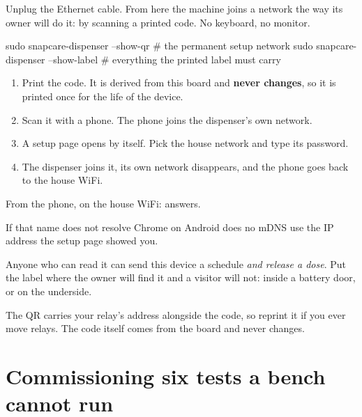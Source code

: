 \documentclass[11pt]{article}
\begin{document}
Unplug the Ethernet cable. From here the machine joins a network the way its
owner will do it: by scanning a printed code. No keyboard, no monitor.

\begin{shell}
sudo snapcare-dispenser --show-qr     # the permanent setup network
sudo snapcare-dispenser --show-label  # everything the printed label must carry
\end{shell}

\begin{enumerate}[leftmargin=*, itemsep=0.5ex]
\item Print the code. It is derived from this board and \textbf{never changes},
      so it is printed once for the life of the device.
\item Scan it with a phone. The phone joins the dispenser's own network.
\item A setup page opens by itself. Pick the house network and type its password.
\item The dispenser joins it, its own network disappears, and the phone goes
      back to the house WiFi.
\end{enumerate}

\begin{provebox}
\provetitle
From the phone, on the house WiFi:
 answers.

\vspace{1ex}
If that name does not resolve \textemdash{} Chrome on Android does no mDNS
\textemdash{} use the IP address the setup page showed you.
\end{provebox}

\vspace{1mm}
\begin{dangerbox}
Anyone who can read it can send this device a schedule \emph{and release a
dose}. Put the label where the owner will find it and a visitor will not: inside
a battery door, or on the underside.
\end{dangerbox}

\vspace{1mm}
\noindent The QR carries your relay's address alongside the code, so reprint it
if you ever move relays. The code itself comes from the board and never changes.

\clearpage

\section{Commissioning \textemdash{} six tests a bench cannot run}
\end{document}
